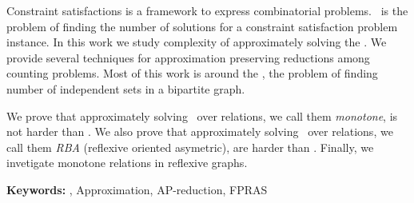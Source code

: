 
%
%

Constraint satisfactions is a framework to express combinatorial problems.
\ccsp\ is the problem of finding the number of solutions for a constraint satisfaction problem
instance. In this work we study complexity of approximately solving the \ccsp\@. We
provide several techniques for approximation preserving reductions
among counting problems. Most of this work is around the \cbis,
the problem of finding number of independent sets in a bipartite graph.

We prove that approximately solving \ccsp\ over relations, we call them \emph{monotone},
is not harder than \cbis\@. We also prove that approximately
solving \ccsp\ over relations, we call them \emph{RBA} (reflexive oriented asymetric), are harder than \cbis\@.
Finally, we invetigate monotone relations in reflexive graphs.

\vspace{1cm}

\noindent \textbf{Keywords:} \ccsp, Approximation, AP-reduction, FPRAS







